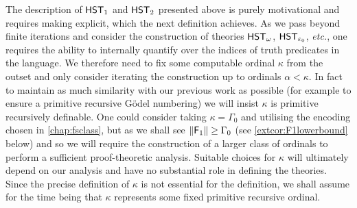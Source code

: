 \documentclass[UKenglish,cleveref,DIV=12]{scrartcl}
\theoremstyle{definition}
\theoremstyle{definition}
\begin{document}
The description of $\mathsf{HST}_1$ and $\mathsf{HST}_2$ presented above is purely motivational and requires making
explicit, which the next definition achieves.
As we pass beyond finite iterations and consider the construction of theories
$\mathsf{HST}_\omega$, $\mathsf{HST}_{\varepsilon_0}$, {\em etc.},  one requires the ability
to internally quantify over the indices of truth predicates in the language. We
therefore need to fix some computable ordinal $\kappa$ from the outset and only
consider iterating the construction up to ordinals $\alpha<\kappa$. In fact to
maintain as much similarity with our previous work as possible ({for
example to ensure a primitive recursive Gödel numbering}) we will insist $\kappa$ is
primitive recursively definable. One could consider taking $\kappa=\Gamma_0$ and
utilising the encoding chosen in \cref{chap:fsclass}, but as we shall see
$\lVert{\mathsf{F}_1}\rVert\ge\Gamma_0$ (see \cref{extcor:F1lowerbound} below) and so we will
require the construction of a larger class of ordinals to perform a sufficient
proof-theoretic analysis. Suitable choices for $\kappa$ will ultimately depend on our
analysis and have no substantial role in defining the theories. Since the
precise definition of $\kappa$ is not essential for the definition, we shall
assume for the time being that $\kappa$ represents some fixed primitive
recursive ordinal.
\end{document}
